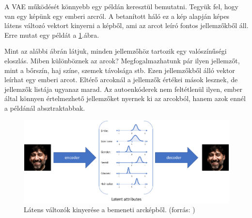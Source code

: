 


A VAE működését könnyebb egy példán keresztül bemutatni. Tegyük fel, hogy van egy képünk egy emberi arcról. A betanított háló ez a kép alapján képes látens változó vektort kinyerni a képből, ami az arcot leíró fontos jellemzőkből áll. Erre mutat egy példát a \ref{fig:vae_face}.ábra.


Mint az alábbi ábrán látjuk, minden jellemzőhöz tartozik egy valószínűségi eloszlás. Miben különböznek az arcok? Megfogalmazhatunk pár ilyen jellemzőt, mint a bőrszín, haj színe, szemek távolsága stb. Ezen jellemzőkből álló vektor leírhat egy emberi arcot. Eltérő arcoknál a jellemzők értékei mások lesznek, de jellemzők listája ugyanaz marad. Az autoenkóderek nem feltétlenül ilyen, ember által könnyen értelmezhető jellemzőket nyernek ki az arcokból, hanem azok ennél a példánál absztraktabbak.

\begin{figure}[ht]
	\centering
	\includegraphics[width=1\columnwidth]{figures/autoenc_latent.png}
	\caption{Látens változók kinyerése a bemeneti arcképből. (forrás: \cite{vae_latent})}
	\label{fig:vae_face}
\end{figure}

